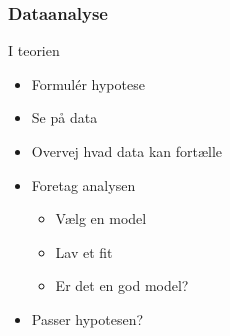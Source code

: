 \documentclass[10pt,
presentation             %
]{beamer}
\begin{document}
\begin{frame}
  \frametitle{Dataanalyse}

  \begin{block}{I teorien}
    \begin{itemize}
    \item Formul\'{e}r hypotese
    \item \alert<3>{Se på data}
    \item \alert<3>{Overvej hvad data kan fortælle}
    \item Foretag analysen
      \begin{itemize}
      \item Vælg en model
      \item Lav et fit
      \item Er det en god model?
      \end{itemize}
    \item Passer hypotesen?
    \end{itemize}
  \end{block}

\end{frame}


%
%

\end{document}
